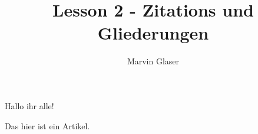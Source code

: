 \documentclass{article}
\title{Lesson 2 - Zitations und Gliederungen}
\author{Marvin Glaser}
\begin{document}
Hallo ihr alle!

Das hier ist ein Artikel.\cite{lehnert2018}




\printbibliography
\end{document}
